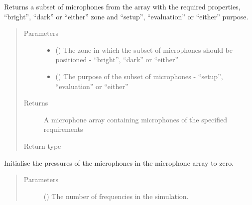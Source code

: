 \documentclass[letterpaper,10pt,english]{sphinxmanual}
\begin{document}
\begin{fulllineitems}
\begin{fulllineitems}
\label{\detokenize{source/pyzones:pyzones.MicrophoneArray.get_subset}}
Returns a subset of microphones from the array with the required properties, “bright”, “dark” or “either” zone
and “setup”, “evaluation” or “either” purpose.
\begin{quote}\begin{description}
\item[{Parameters}] \leavevmode\begin{itemize}
\item {} 
 () \textendash{} The zone in which the subset of microphones should be positioned - “bright”, “dark” or “either”

\item {} 
 () \textendash{} The purpose of the subset of microphones - “setup”, “evaluation” or “either”

\end{itemize}

\item[{Returns}] \leavevmode
A microphone array containing microphones of the specified requirements

\item[{Return type}] \leavevmode
{\hyperref[\detokenize{source/pyzones:pyzones.MicrophoneArray}]{}}

\end{description}\end{quote}

\end{fulllineitems}


\begin{fulllineitems}
\label{\detokenize{source/pyzones:pyzones.MicrophoneArray.initialise_pressures}}
Initialise the pressures of the microphones in the microphone array to zero.
\begin{quote}\begin{description}
\item[{Parameters}] \leavevmode
{} () \textendash{} The number of frequencies in the simulation.


\end{description}
\end{quote}
\end{fulllineitems}
\end{fulllineitems}
\end{document}
